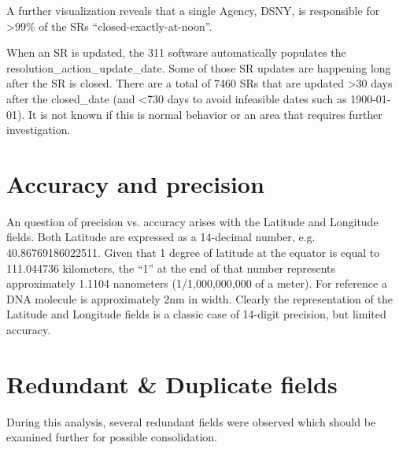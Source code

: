 \documentclass[12pt, titlepage]{article}
\begin{document}
A further visualization reveals that  a single Agency, DSNY, is 
responsible for \textgreater99\% of the SRs ``closed-exactly-at-noon''. 
	
	
		
\label{sec: resolutionaction}
When an SR is updated, the 311 software automatically 
populates the resolution\_action\_update\_date. Some of 
those SR updates are happening long after the SR is 
closed. There are a total of 7460 SRs that are updated \textgreater30 days 
after the closed\_date (and \textless{}730 days to avoid infeasible 
dates such as 1900-01-01). It is not known if this is normal behavior
 or an area that requires further investigation. 
	
	


	
\section{Accuracy and precision}
\label{sec:precision}
An question of precision vs. accuracy arises with the Latitude 
and Longitude fields. Both Latitude are 
expressed as a 14-decimal number, e.g. 40.86769186022511. Given 
that 1 degree of latitude at the equator is equal to 111.044736 
kilometers, the ``1'' at the end of that number represents 
approximately 1.1104 nanometers (1/1,000,000,000 of a meter). For 
reference a DNA molecule is approximately 2nm in width. Clearly 
the representation of the Latitude and Longitude fields is a 
classic case of 14-digit precision, but limited accuracy. 



\section{Redundant \& Duplicate fields}\label{sec:duplicates}
During this analysis, several redundant fields were observed which
should be examined further for possible consolidation.
\end{document}
